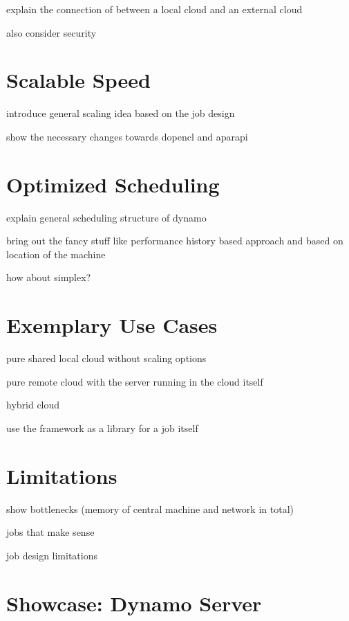 explain the connection of between a local cloud and an external cloud


also consider security

\section{Scalable Speed}

introduce general scaling idea based on the job design

show the necessary changes towards dopencl and aparapi

\section{Optimized Scheduling}

explain general scheduling structure of dynamo

bring out the fancy stuff like performance history based approach and based on location of the machine

how about simplex?

\section{Exemplary Use Cases}

pure shared local cloud without scaling options

pure remote cloud with the server running in the cloud itself

hybrid cloud

use the framework as a library for a job itself
\section{Limitations}

show bottlenecks (memory of central machine and network in total)

jobs that make sense

job design limitations

\section{Showcase: Dynamo Server}
